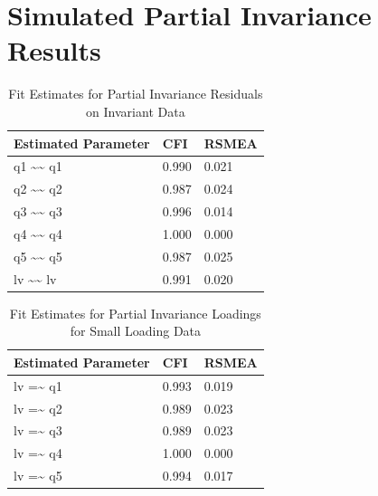 \documentclass[
  man]{apa7}
\begin{document}
\hypertarget{simulated-partial-invariance-results}{%
\section{Simulated Partial Invariance Results}\label{simulated-partial-invariance-results}}

\begin{table}[tbp]

\begin{center}
\begin{threeparttable}

\caption{\label{tab:p-tab11}Fit Estimates for Partial Invariance Residuals on Invariant Data}

\begin{tabular}{lll}
\toprule
Estimated Parameter & CFI & RSMEA\\
\midrule
q1 \textasciitilde{}\textasciitilde{} q1 & 0.990 & 0.021\\
q2 \textasciitilde{}\textasciitilde{} q2 & 0.987 & 0.024\\
q3 \textasciitilde{}\textasciitilde{} q3 & 0.996 & 0.014\\
q4 \textasciitilde{}\textasciitilde{} q4 & 1.000 & 0.000\\
q5 \textasciitilde{}\textasciitilde{} q5 & 0.987 & 0.025\\
lv \textasciitilde{}\textasciitilde{} lv & 0.991 & 0.020\\
\bottomrule
\end{tabular}

\end{threeparttable}
\end{center}

\end{table}

\begin{table}[tbp]

\begin{center}
\begin{threeparttable}

\caption{\label{tab:p-tab12}Fit Estimates for Partial Invariance Loadings for Small Loading Data}

\begin{tabular}{lll}
\toprule
Estimated Parameter & CFI & RSMEA\\
\midrule
lv =\textasciitilde{} q1 & 0.993 & 0.019\\
lv =\textasciitilde{} q2 & 0.989 & 0.023\\
lv =\textasciitilde{} q3 & 0.989 & 0.023\\
lv =\textasciitilde{} q4 & 1.000 & 0.000\\
lv =\textasciitilde{} q5 & 0.994 & 0.017\\
\bottomrule
\end{tabular}

\end{threeparttable}
\end{center}

\end{table}
\end{document}

